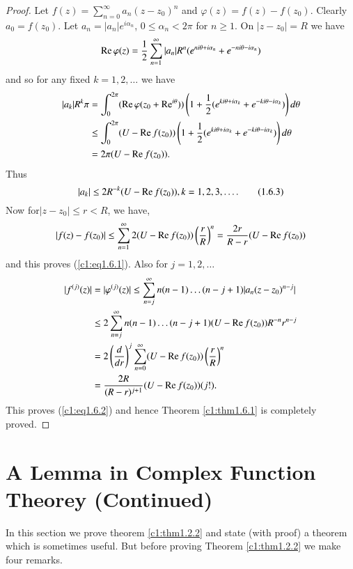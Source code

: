 \begin{proof}
Let $f(z) = \sum\limits^\infty_{n=0} a_n (z-z_0)^n$ and $\varphi(z) = f(z) - f(z_0)$. Clearly $a_0 = f(z_0)$. Let $a_n = |a_n| e^{i\alpha_n}$, $0 \leq \alpha_n < 2 \pi$ for $n \geq 1$. On $|z-z_0| =R$ we have 
$$
\operatorname{Re} \varphi(z) = \frac{1}{2} \sum\limits^\infty_{n=1} |a_n| R^n (e^{n i \theta + i \alpha_n} + e^{-ni\theta - i \alpha_n})
$$
and so for any fixed $k=1,2,\ldots$ we have
\begin{align*}
|a_k| R^k \pi & = \int^{2\pi}_0 (\operatorname{Re} \varphi (z_0 + \operatorname{Re}^{i\theta}))  \left(1+\frac{1}{2} (e^{ki\theta + i \alpha_k} + e^{-ki\theta -i\alpha_k}) \right) d \theta\\
& \leq \int^{2\pi}_0 (U - \operatorname{Re} f(z_0)) \left(1+\frac{1}{2} (e^{ki\theta + i \alpha_k} + e^{-ki\theta - i \alpha_k} ) \right) d \theta\\
& = 2\pi (U - \operatorname{Re} f(z_0)). 
\end{align*}
Thus
\begin{equation*}
|a_k| \leq 2 R^{-k} (U - \operatorname{Re} f (z_0)), k = 1,2,3, \ldots. \tag{1.6.3}\label{c1:eq1.6.3}
\end{equation*}
Now for\pageoriginale $|z-z_0| \leq r < R$, we have,
$$
|f(z) - f(z_0)| \leq \sum\limits^\infty_{n=1} 2 (U - \operatorname{Re} f (z_0)) \left(\frac{r}{R} \right)^n = \frac{2r}{R-r} (U - \operatorname{Re} f (z_0))
$$
and this proves (\ref{c1:eq1.6.1}). Also for $j=1,2, \ldots$
\begin{align*}
|f^{(j)} (z)| & =  |\varphi^{(j)} (z)| \leq \sum\limits^{\infty}_{n=j} n(n-1) \ldots (n- j+1) |a_n (z-z_0)^{n-j}|\\
&  \leq 2 \sum\limits^\infty_{n=j} n (n-1) \ldots (n-j+1) (U - \operatorname{Re} f(z_0)) R^{-n} r^{n-j}\\
& = 2 \left(\frac{d}{dr} \right)^j \sum\limits^\infty_{n=0} (U - \operatorname{Re} f(z_0)) \left(\frac{r}{R} \right)^n\\
& = \frac{2R}{(R-r)^{j+1}} (U - \operatorname{Re} f(z_0)) (j!).
\end{align*}
This proves (\ref{c1:eq1.6.2}) and hence Theorem \ref{c1:thm1.6.1} is completely proved.
\end{proof}

\section{A Lemma in Complex Function Theorey (Continued)}\label{c1:sec1.7}

In this section we prove theorem \ref{c1:thm1.2.2} and state (with proof) a theorem which is sometimes useful. But before proving Theorem \ref{c1:thm1.2.2} we make four remarks.

